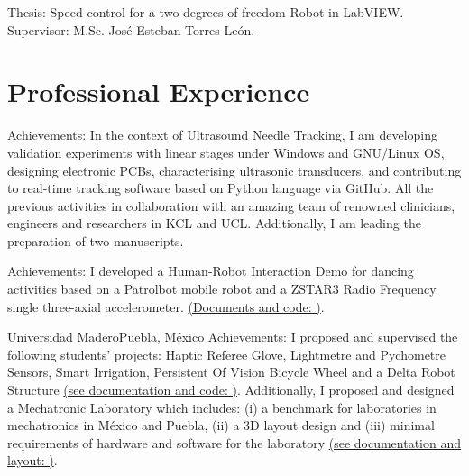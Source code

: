 \documentclass[10pt,a4paper,roman]{moderncv}
\begin{document}
  {Thesis: Speed control for a two-degrees-of-freedom Robot in LabVIEW.
  \href{https://github.com/mxochicale/publications/blob/master/thesis/B.Eng./doc/MPXochicale_BachelorEngThesis-2003.pdf}{\faFilePdfO}
  \href{https://github.com/mxochicale/publications/tree/master/thesis/B.Eng.}{\faGithubAlt}
  \\ Supervisor: M.Sc. Jos\'e Esteban Torres Le\'on.}




\section{Professional Experience}

{Achievements:
In the context of Ultrasound Needle Tracking,
I am developing validation experiments with linear stages under Windows and GNU/Linux OS, 
designing electronic PCBs, 
characterising ultrasonic transducers, 
and contributing to real-time tracking software based on Python language
via GitHub. All the previous activities in collaboration with an amazing 
team of renowned clinicians, engineers and researchers in KCL and UCL.
Additionally, I am leading the preparation of two manuscripts.
}


{Achievements: I developed a Human-Robot Interaction Demo for dancing activities based on 
a Patrolbot mobile robot and a ZSTAR3 Radio Frequency single three-axial accelerometer.
\href{https://sites.google.com/site/perezxochicale/projects/demodance}{(Documents and code: \faExternalLink)}.
}

{Universidad Madero}{Puebla, M\'exico}{}
{Achievements:
I proposed and supervised the following students' projects: Haptic Referee Glove,
 Lightmetre and Pychometre Sensors, Smart Irrigation, Persistent Of Vision Bicycle Wheel
 and a Delta Robot Structure 
\href{https://sites.google.com/site/perezxochicaleprojects/studentprojects}{(see documentation and code: \faExternalLink)}.
Additionally, I proposed and designed a Mechatronic Laboratory which includes: 
(i) a benchmark for laboratories in mechatronics in M\'exico and Puebla, 
(ii) a 3D layout design and 
(iii) minimal requirements of hardware and software for the laboratory
 \href{https://sites.google.com/site/perezxochicaleprojects/mechatronicslaboratorydesign}{(see documentation and layout: \faExternalLink)}.
}
\end{document}
